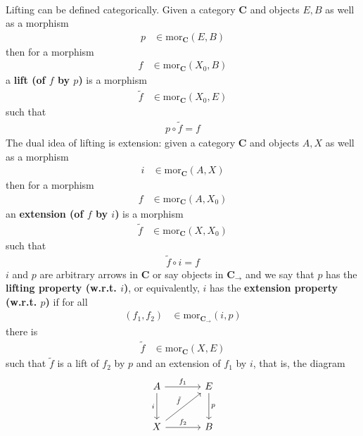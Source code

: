 \\
Lifting can be defined categorically. Given a category $\mathbf{C}$ and objects $E,B$ as well as a morphism
\begin{align*}
  p
  &\in
  \mathrm{mor}_{\mathbf{C}}(E,B)
\end{align*}
then for a morphism
\begin{align*}
  f
  &\in
  \mathrm{mor}_{\mathbf{C}}(X_{0},B)
\end{align*}
a \textbf{lift (of $f$ by $p$)} is a morphism
\begin{align*}
  \tilde{f}
  &\in
  \mathrm{mor}_{\mathbf{C}}(X_{0},E)
\end{align*}
such that
\begin{align*}
  p
  \circ
  \tilde{f}
  =
  f
\end{align*}
The dual idea of lifting is extension: given a category $\mathbf{C}$ and objects $A,X$ as well as a morphism
\begin{align*}
  i
  &\in
  \mathrm{mor}_{\mathbf{C}}(A,X)
\end{align*}
then for a morphism
\begin{align*}
  f
  &\in
  \mathrm{mor}_{\mathbf{C}}(A,X_{0})
\end{align*}
an \textbf{extension (of $f$ by $i$)} is a morphism
\begin{align*}
  \tilde{f}
  &\in
  \mathrm{mor}_{\mathbf{C}}(X,X_{0})
\end{align*}
such that
\begin{align*}
  \tilde{f}
  \circ
  i
  =
  f
\end{align*}
$i$ and $p$ are arbitrary arrows in $\mathbf{C}$ or say objects in $\mathbf{C}_{\rightarrow}$ and we say that $p$ has the \textbf{lifting property (w.r.t. $i$)}, or equivalently, $i$ has the \textbf{extension property (w.r.t. $p$)} if for all
\begin{align*}
  (f_{1},f_{2})
  &\in
  \mathrm{mor}_{\mathbf{C}_{\rightarrow}}(i,p)
\end{align*}
there is
\begin{align*}
  \tilde{f}
  &\in
  \mathrm{mor}_{\mathbf{C}}(X,E)
\end{align*}
such that $\tilde{f}$ is a lift of $f_{2}$ by $p$ and an extension of $f_{1}$ by $i$, that is, the diagram
\[
\begin{tikzcd}[sep=large]
  A
  \arrow{r}{f_{1}}
  \arrow[swap]{d}{i}
  &
  E
  \arrow{d}{p}
  \\
  X
  \arrow{ur}{\tilde{f}}
  \arrow{r}{f_{2}}
  &
  B
\end{tikzcd}
\]
